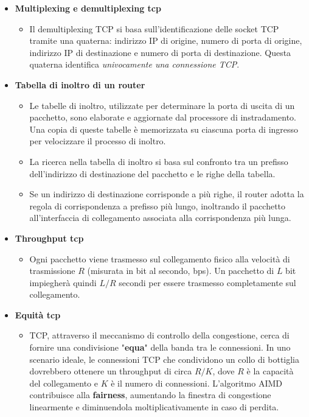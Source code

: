 \begin{itemize}
\begin{itemize}
        \end{itemize}
    \item \textbf{Multiplexing e demultiplexing tcp}
        \begin{itemize}
            \item Il demultiplexing TCP si basa sull'identificazione delle socket TCP tramite una quaterna: indirizzo IP di origine, numero di porta di origine, indirizzo IP di destinazione e numero di porta di destinazione. Questa quaterna identifica \textit{univocamente una connessione TCP}.
        \end{itemize}
    \item \textbf{Tabella di inoltro di un router}
        \begin{itemize}
            \item Le tabelle di inoltro, utilizzate per determinare la porta di uscita di un pacchetto, sono elaborate e aggiornate dal processore di instradamento. Una copia di queste tabelle è memorizzata su ciascuna porta di ingresso per velocizzare il processo di inoltro.
            \item La ricerca nella tabella di inoltro si basa sul confronto tra un prefisso dell'indirizzo di destinazione del pacchetto e le righe della tabella.
            \item Se un indirizzo di destinazione corrisponde a più righe, il router adotta la regola di corrispondenza a prefisso più lungo, inoltrando il pacchetto all'interfaccia di collegamento associata alla corrispondenza più lunga.
        \end{itemize}
    \item \textbf{Throughput tcp}
        \begin{itemize}
            \item Ogni pacchetto viene trasmesso sul collegamento fisico alla velocità di trasmissione $R$ (misurata in bit al secondo, bps). Un pacchetto di $L$ bit impiegherà quindi $L/R$ secondi per essere trasmesso completamente sul collegamento.
        \end{itemize}
    \item \textbf{Equità tcp}
        \begin{itemize}
            \item TCP, attraverso il meccanismo di controllo della congestione, cerca di fornire una condivisione "\textbf{equa}" della banda tra le connessioni. In uno scenario ideale, le connessioni TCP che condividono un collo di bottiglia dovrebbero ottenere un throughput di circa $R/K$, dove $R$ è la capacità del collegamento e $K$ è il numero di connessioni. L'algoritmo AIMD contribuisce alla \textbf{fairness}, aumentando la finestra di congestione linearmente e diminuendola moltiplicativamente in caso di perdita.

\end{itemize}
\end{itemize}
